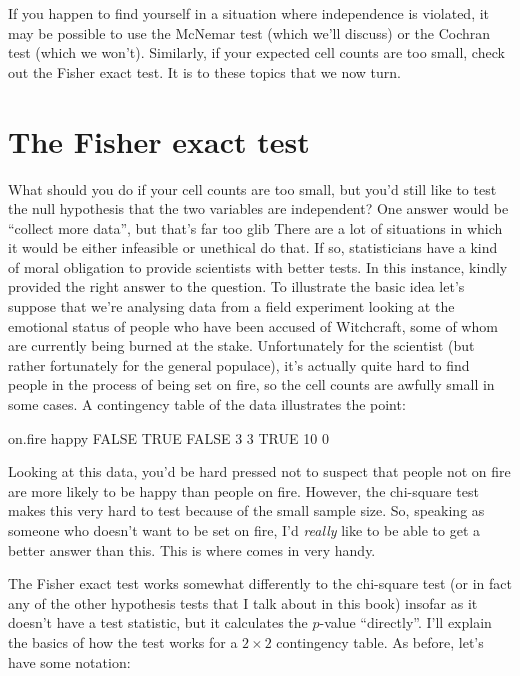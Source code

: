 \noindent
If you happen to find yourself in a situation where independence is violated, it may be possible to use the McNemar test (which we'll discuss) or the Cochran test (which we won't). Similarly, if your expected cell counts are too small, check out the Fisher exact test. It is to these topics that we now turn. 


\section{The Fisher exact test~\label{sec:fisherexacttest}}

What should you do if your cell counts are too small, but you'd still like to test the null hypothesis that the two variables are independent? One answer would be ``collect more data'', but that's far too glib There are a lot of situations in which it would be either infeasible or unethical do that. If so, statisticians have a kind of moral obligation to provide scientists with better tests. In this instance, \textcite{Fisher1922} kindly provided the right answer to the question. To illustrate the basic idea let's suppose that we're analysing data from a field experiment looking at the emotional status of people who have been accused of Witchcraft, some of whom are currently being burned at the stake. Unfortunately for the scientist (but rather fortunately for the general populace), it's actually quite hard to find people in the process of being set on fire, so the cell counts are awfully small in some cases. A contingency table of the  data illustrates the point:

\begin{rblock1}
       on.fire
happy   FALSE TRUE
  FALSE     3    3
  TRUE     10    0
\end{rblock1}

Looking at this data, you'd be hard pressed not to suspect that people not on fire are more likely to be happy than people on fire. However, the chi-square test makes this very hard to test because of the small sample size. So, speaking as someone who doesn't want to be set on fire, I'd {\it really} like to be able to get a better answer than this. This is where  \parencite{Fisher1922} comes in very handy. 

The Fisher exact test works somewhat differently to the chi-square test (or in fact any of the other hypothesis tests that I talk about in this book) insofar as it doesn't have a test statistic, but it calculates the $p$-value ``directly''. I'll explain the basics of how the test works for a $2 \times 2$ contingency table. As before, let's have some notation: 

